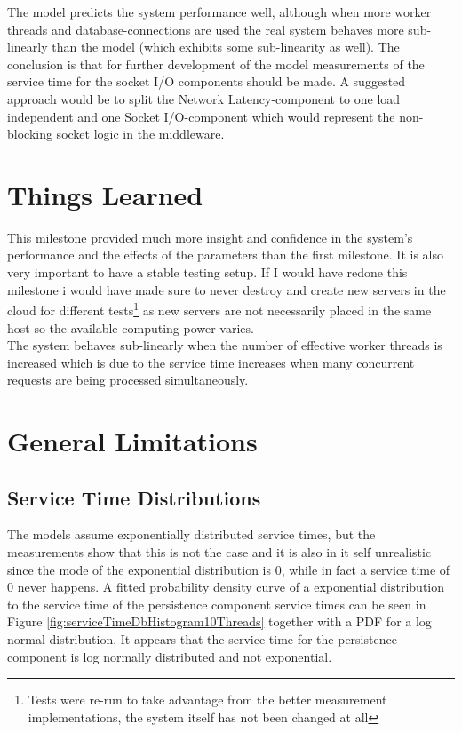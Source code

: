 \documentclass[a4paper, 11pt]{article}
\begin{document}
	The model predicts the system performance well, although when more worker threads and database-connections are used the real system behaves more sub-linearly than the model (which exhibits some sub-linearity as well). The conclusion is that for further development of the model measurements of the service time for the socket I/O components should be made. A suggested approach would be to split the Network Latency-component to one load independent and one Socket I/O-component which would represent the non-blocking socket logic in the middleware.

\section{Things Learned}
	This milestone provided much more insight and confidence in the system's performance and the effects of the parameters than the first milestone. It is also very important to have a stable testing setup. If I would have redone this milestone i would have made sure to never destroy and create new servers in the cloud for different tests\footnote{Tests were re-run to take advantage from the better measurement implementations, the system itself has not been changed at all} as new servers are not necessarily placed in the same host so the available computing power varies.\\

	The system behaves sub-linearly when the number of effective worker threads is increased which is due to the service time increases when many concurrent requests are being processed simultaneously.

\section{General Limitations}

	\subsection{Service Time Distributions}
		The models assume exponentially distributed service times, but the measurements show that this is not the case and it is also in it self unrealistic since the mode of the exponential distribution is 0, while in fact a service time of 0 never happens. A fitted probability density curve of a exponential distribution to the service time of the persistence component service times can be seen in Figure \ref{fig:serviceTimeDbHistogram10Threads} together with a PDF for a log normal distribution. It appears that the service time for the persistence component is log normally distributed and not exponential.
\end{document}
